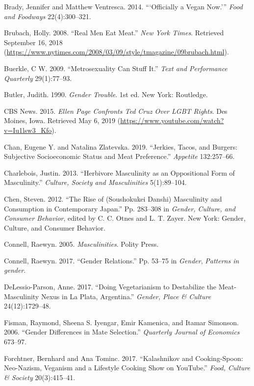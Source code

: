 \documentclass[twoside]{report}
\begin{document}
\hypertarget{brady}{Brady, Jennifer and Matthew Ventresca. 2014. ```Officially a Vegan Now.''' \emph{Food and Foodways} 22(4):300--321.}

\hypertarget{brubach}{Brubach, Holly. 2008. ``Real Men Eat Meat.'' \emph{New York Times}. Retrieved September 16, 2018 (\url{https://www.nytimes.com/2008/03/09/style/tmagazine/09brubach.html}).}

\hypertarget{buerkle}{Buerkle, C W. 2009. ``Metrosexuality Can Stuff It.'' \emph{Text and Performance Quarterly} 29(1):77--93.}

\hypertarget{butler}{Butler, Judith. 1990. \emph{Gender Trouble}. 1st ed. New York: Routledge.}

\hypertarget{cbs}{CBS News. 2015. \emph{Ellen Page Confronts Ted Cruz Over LGBT Rights}. Des Moines, Iowa. Retrieved May 6, 2019 (\url{https://www.youtube.com/watch?v=Iu1lsw3_Kfo}).}

\hypertarget{chan}{Chan, Eugene Y. and Natalina Zlatevska. 2019. ``Jerkies, Tacos, and Burgers: Subjective Socioeconomic Status and Meat Preference.'' \emph{Appetite} 132:257--66.}

\hypertarget{charlebois}{Charlebois, Justin. 2013. ``Herbivore Masculinity as an Oppositional Form of Masculinity.'' \emph{Culture, Society and Masculinities} 5(1):89--104.}

\hypertarget{chen}{Chen, Steven. 2012. ``The Rise of (Soushokukei Danshi) Masculinity and Consumption in Contemporary Japan.'' Pp. 283--308 in \emph{Gender, Culture, and Consumer Behavior}, edited by C. C. Otnes and L. T. Zayer. New York: Gender, Culture, and Consumer Behavior.}

\hypertarget{connell}{Connell, Raewyn. 2005. \emph{Masculinities}. Polity Press.}

\hypertarget{connell2}{Connell, Raewyn. 2017. ``Gender Relations.'' Pp. 53--75 in \emph{Gender}, \emph{Patterns in gender}.}

\hypertarget{delassio-parson}{DeLessio-Parson, Anne. 2017. ``Doing Vegetarianism to Destabilize the Meat-Masculinity Nexus in La Plata, Argentina.'' \emph{Gender, Place \& Culture} 24(12):1729--48.}

\hypertarget{fisman}{Fisman, Raymond, Sheena S. Iyengar, Emir Kamenica, and Itamar Simonson. 2006. ``Gender Differences in Mate Selection.'' \emph{Quarterly Journal of Economics} 673--97.}

\hypertarget{forchtner}{Forchtner, Bernhard and Ana Tominc. 2017. ``Kalashnikov and Cooking-Spoon: Neo-Nazism, Veganism and a Lifestyle Cooking Show on YouTube.'' \emph{Food, Culture \& Society} 20(3):415--41.}
\end{document}
